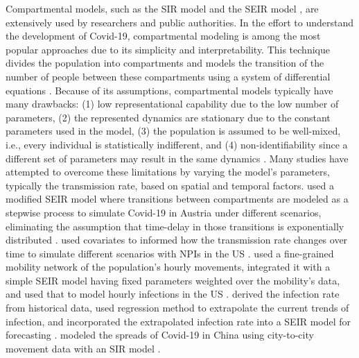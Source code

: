 Compartmental models, such as the SIR model and the SEIR model \cite{kermackContributionMathematicalTheory1927}, are extensively used by researchers and public authorities.
In the effort to understand the development of Covid-19, compartmental modeling is among the most popular approaches due to its simplicity and interpretability.
This technique divides the population into compartments and models the transition of the number of people between these compartments using a system of differential equations \cite{brauerCompartmentalModelsEpidemiology2008}.
Because of its assumptions, compartmental models typically have many drawbacks: (1) low representational capability due to the low number of parameters, (2) the represented dynamics are stationary due to the constant parameters used in the model, (3) the population is assumed to be well-mixed, i.e., every individual is statistically indifferent, and (4) non-identifiability since a different set of parameters may result in the same dynamics \cite{roosaAssessingParameterIdentifiability2019}.
Many studies have attempted to overcome these limitations by varying the model's parameters, typically the transmission rate, based on spatial and temporal factors.
\citeauthor{schneiderCOVID19PandemicPreparedness2020} used a modified SEIR model where transitions between compartments are modeled as a stepwise process to simulate Covid-19 in Austria under different scenarios, eliminating the assumption that time-delay in those transitions is exponentially distributed \cite{schneiderCOVID19PandemicPreparedness2020}.
\citeauthor{ihmecovid-19forecastingteamModelingCOVID19Scenarios2021} used covariates to informed how the transmission rate changes over time to simulate different scenarios with \glspl{NPI} in the \gls{US} \cite{ihmecovid-19forecastingteamModelingCOVID19Scenarios2021}.
\citeauthor{changMobilityNetworkModels2021} used a fine-grained mobility network of the population's hourly movements, integrated it with a simple SEIR model having fixed parameters weighted over the mobility's data, and used that to model hourly infections in the \gls{US} \cite{changMobilityNetworkModels2021}.
\citeauthor{chenTimeDependentSIRModel2020} derived the infection rate from historical data, used regression method to extrapolate the current trends of infection, and incorporated the extrapolated infection rate into a SEIR model for forecasting \cite{chenTimeDependentSIRModel2020}.
\citeauthor{liSubstantialUndocumentedInfection2020} modeled the spreads of Covid-19 in China using city-to-city movement data with an SIR model \cite{liSubstantialUndocumentedInfection2020}.

